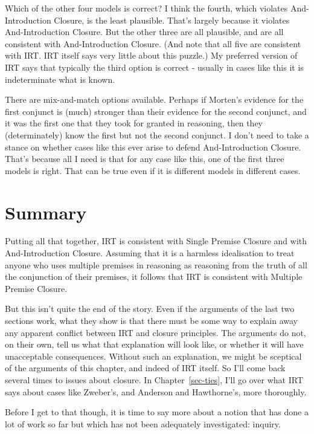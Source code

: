 \documentclass[
  10pt,
  letterpaper,
  twoside]{scrbook}
\begin{document}
Which of the other four models is correct? I think the fourth, which
violates And-Introduction Closure, is the least plausible. That's
largely because it violates And-Introduction Closure. But the other
three are all plausible, and are all consistent with And-Introduction
Closure. (And note that all five are consistent with IRT. IRT itself
says very little about this puzzle.) My preferred version of IRT says
that typically the third option is correct - usually in cases like this
it is indeterminate what is known.

There are mix-and-match options available. Perhaps if Morten's evidence
for the first conjunct is (much) stronger than their evidence for the
second conjunct, and it was the first one that they took for granted in
reasoning, then they (determinately) know the first but not the second
conjunct. I don't need to take a stance on whether cases like this ever
arise to defend And-Introduction Closure. That's because all I need is
that for any case like this, one of the first three models is right.
That can be true even if it is different models in different cases.

\section{Summary}\label{sec-closuresummary}

Putting all that together, IRT is consistent with Single Premise Closure
and with And-Introduction Closure. Assuming that it is a harmless
idealisation to treat anyone who uses multiple premises in reasoning as
reasoning from the truth of all the conjunction of their premises, it
follows that IRT is consistent with Multiple Premise Closure.

But this isn't quite the end of the story. Even if the arguments of the
last two sections work, what they show is that there must be some way to
explain away any apparent conflict between IRT and closure principles.
The arguments do not, on their own, tell us what that explanation will
look like, or whether it will have unacceptable consequences. Without
such an explanation, we might be sceptical of the arguments of this
chapter, and indeed of IRT itself. So I'll come back several times to
issues about closure. In Chapter~\ref{sec-ties}, I'll go over what IRT
says about cases like Zweber's, and Anderson and Hawthorne's, more
thoroughly.

Before I get to that though, it is time to say more about a notion that
has done a lot of work so far but which has not been adequately
investigated: inquiry.
\end{document}
